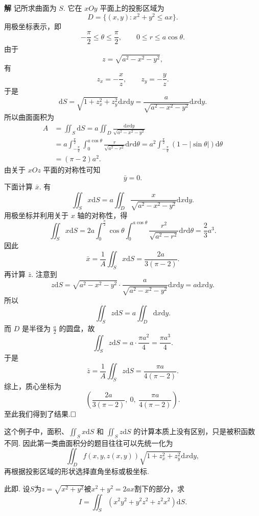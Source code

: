 \documentclass{ctexart}
\newenvironment{custom}[1]{\par\noindent \textbf{#1}\quad}{\par\vspace{1em}}
\begin{document}
\begin{custom}{解}
记所求曲面为 $S$. 它在 $xOy$ 平面上的投影区域为
\[
D=\{(x,y):x^{2}+y^{2}\leqslant ax\}.
\]
用极坐标表示，即
\[
-\frac{\pi}{2}\leqslant \theta\leqslant \frac{\pi}{2},\qquad
0\leqslant r\leqslant a\cos\theta.
\]
由于
\[
z=\sqrt{a^{2}-x^{2}-y^{2}},
\]
有
\[
z_{x}=-\frac{x}{z},\qquad z_{y}=-\frac{y}{z}.
\]
于是
\[
\mathrm{d}S
=\sqrt{1+z_{x}^{2}+z_{y}^{2}}\mathrm{d}x\mathrm{d}y
=\frac{a}{\sqrt{a^{2}-x^{2}-y^{2}}}\mathrm{d}x\mathrm{d}y.
\]
所以曲面面积为
\[
\begin{aligned}
A&=\iint_{S}\mathrm{d}S=a\iint_{D}\frac{\mathrm{d}x\mathrm{d}y}{\sqrt{a^{2}-x^{2}-y^{2}}}\\
&=a\int_{-\frac{\pi}{2}}^{\frac{\pi}{2}}
\int_{0}^{a\cos\theta}
\frac{r}{\sqrt{a^{2}-r^{2}}}\mathrm{d}r\mathrm{d}\theta=a^{2}\int_{-\frac{\pi}{2}}^{\frac{\pi}{2}}
(1-|\sin\theta|)\mathrm{d}\theta\\
&=(\pi-2)a^{2}.
\end{aligned}
\]
由关于 $xOz$ 平面的对称性可知
\[
\bar{y}=0.
\]
下面计算 $\bar{x}$. 有
\[
\iint_{S}x\mathrm{d}S
=a\iint_{D}\frac{x}{\sqrt{a^{2}-x^{2}-y^{2}}}\mathrm{d}x\mathrm{d}y.
\]
用极坐标并利用关于 $x$ 轴的对称性，得
\[
\iint_{S}x\mathrm{d}S=2a\int_{0}^{\frac{\pi}{2}}\cos\theta
\int_{0}^{a\cos\theta}
\frac{r^{2}}{\sqrt{a^{2}-r^{2}}}\mathrm{d}r\mathrm{d}\theta=\frac{2}{3}a^{3}.
\]
因此
\[
\bar{x}
=\frac{1}{A}\iint_{S}x\mathrm{d}S
=\frac{2a}{3(\pi-2)}.
\]
再计算 $\bar{z}$. 注意到
\[
z\mathrm{d}S
=\sqrt{a^{2}-x^{2}-y^{2}}\cdot
\frac{a}{\sqrt{a^{2}-x^{2}-y^{2}}}\mathrm{d}x\mathrm{d}y
=a\mathrm{d}x\mathrm{d}y.
\]
所以
\[
\iint_{S}z\mathrm{d}S
=a\iint_{D}\mathrm{d}x\mathrm{d}y.
\]
而 $D$ 是半径为 $\frac{a}{2}$ 的圆盘，故
\[
\iint_{S}z\mathrm{d}S
=a\cdot \frac{\pi a^{2}}{4}
=\frac{\pi a^{3}}{4}.
\]
于是
\[
\bar{z}
=\frac{1}{A}\iint_{S}z\mathrm{d}S
=\frac{\pi a}{4(\pi-2)}.
\]
综上，质心坐标为
\[
\left(
\frac{2a}{3(\pi-2)},\ 0,\ \frac{\pi a}{4(\pi-2)}
\right).
\]
至此我们得到了结果.$\hfill{\square}$
\end{custom}

这个例子中，面积、$\iint_S x\mathrm{d}S$ 和 $\iint_S z\mathrm{d}S$ 的计算本质上没有区别，只是被积函数不同. 因此第一类曲面积分的题目往往可以先统一化为
\[
\iint_{D} f(x,y,z(x,y))\sqrt{1+z_x^2+z_y^2}\mathrm{d}x\mathrm{d}y,
\]
再根据投影区域的形状选择直角坐标或极坐标.

\begin{example}
此即\cite[例题25.1.1]{XHM}. 设$S$为$z=\sqrt{x^{2}+y^{2}}$被$x^{2}+y^{2}=2ax$割下的部分，求
\[
I=\iint_{S}{(x^{2}y^{2}+y^{2}z^{2}+z^{2}x^{2})\mathrm{d}S}.
\]
\end{example}
\end{document}
